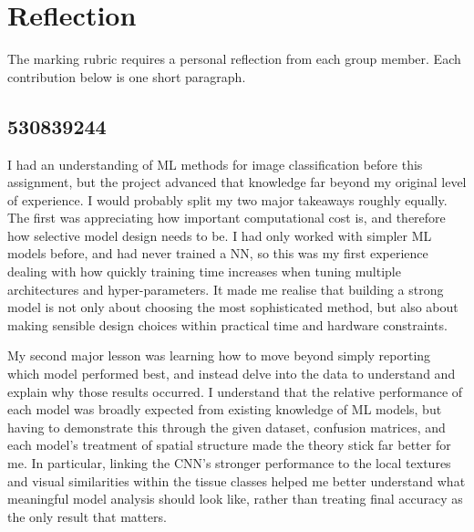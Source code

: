 \documentclass[../main.tex]{subfiles}
\begin{document}
\section{Reflection}
\noindent
The marking rubric requires a personal reflection from each group member.
Each contribution below is one short paragraph.

\subsection*{530839244}
\noindent
I had an understanding of \gls{ML} methods for image classification before this assignment, but the project advanced that knowledge far beyond my original level of experience. I would probably split my two major takeaways roughly equally. The first was appreciating how important computational cost is, and therefore how selective model design needs to be. I had only worked with simpler \gls{ML} models before, and had never trained a \gls{NN}, so this was my first experience dealing with how quickly training time increases when tuning multiple architectures and hyper-parameters. It made me realise that building a strong model is not only about choosing the most sophisticated method, but also about making sensible design choices within practical time and hardware constraints.

\noindent My second major lesson was learning how to move beyond simply reporting which model performed best, and instead delve into the data to understand and explain why those results occurred. I understand that the relative performance of each model was broadly expected from existing knowledge of \gls{ML} models, but having to demonstrate this through the given dataset, confusion matrices, and each model’s treatment of spatial structure made the theory stick far better for me. In particular, linking the CNN’s stronger performance to the local textures and visual similarities within the tissue classes helped me better understand what meaningful model analysis should look like, rather than treating final accuracy as the only result that matters.
\end{document}
